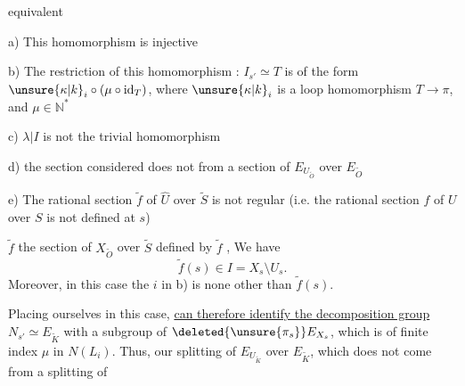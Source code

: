 equivalent

a) This homomorphism is injective

b) The restriction of this homomorphism : $I_{s'}\simeq T$ is
of the form $\unsure{\kappa|k}_i\circ(\mu\circ\operatorname{id}_T)$, where $\unsure{\kappa|k}_i$ is a
loop homomorphism $T\longrightarrow\pi$, and $\mu\in\mathbb N^{*}$

c) $\lambda\vert I$ is not the trivial homomorphism

d) the section considered  does not 
from a section of $E_{U_{\widetilde O}}$ over $E_{\widetilde O}$

e) The rational  section $\widetilde f$ of $\widehat U$ over
$\widetilde S$ is not regular (i.e. the rational section
$f$ of $U$ over $S$ is not defined at $s$)

  $\widetilde f$  the section of $X_{\widetilde O}$ over $\widetilde S$
defined by $\widetilde f$ ,
 We have
\[
\widetilde f(s)\in I=X_s\setminus U_s.
\]
Moreover, in this case the $i$ in b) is none
other than $\widetilde f(s)$.

Placing ourselves in this case, \uline{ can therefore
identify the decomposition group} $N_{s'}\simeq E_{\widetilde K}$
with a subgroup of $\deleted{\unsure{\pi_s}}E_{X_s}$,  which is
of finite index $\mu$ in  $N(L_i)$. Thus,
our splitting  of $E_{U_{\widetilde K}}$  over $E_{\widetilde K}$,
which does not come from a splitting of
